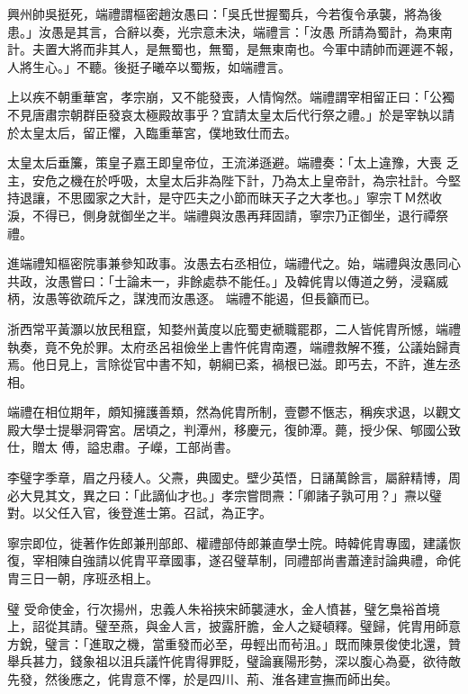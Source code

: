 \begin{pinyinscope}
 興州帥吳挺死，端禮謂樞密趙汝愚曰：「吳氏世握蜀兵，今若復令承襲，將為後患。」汝愚是其言，合辭以奏，光宗意未決，端禮言：「汝愚
 所請為蜀計，為東南計。夫置大將而非其人，是無蜀也，無蜀，是無東南也。今軍中請帥而遲遲不報，人將生心。」不聽。後挺子曦卒以蜀叛，如端禮言。



 上以疾不朝重華宮，孝宗崩，又不能發喪，人情恟然。端禮謂宰相留正曰：「公獨不見唐肅宗朝群臣發哀太極殿故事乎？宜請太皇太后代行祭之禮。」於是宰執以請於太皇太后，留正懼，入臨重華宮，僕地致仕而去。



 太皇太后垂簾，策皇子嘉王即皇帝位，王流涕遜避。端禮奏：「太上違豫，大喪
 乏主，安危之機在於呼吸，太皇太后非為陛下計，乃為太上皇帝計，為宗社計。今堅持退讓，不思國家之大計，是守匹夫之小節而昧天子之大孝也。」寧宗ＴＭ然收淚，不得已，側身就御坐之半。端禮與汝愚再拜固請，寧宗乃正御坐，退行禫祭禮。



 進端禮知樞密院事兼參知政事。汝愚去右丞相位，端禮代之。始，端禮與汝愚同心共政，汝愚嘗曰：「士論未一，非餘處恭不能任。」及韓侂胄以傳道之勞，浸竊威柄，汝愚等欲疏斥之，謀洩而汝愚逐。
 端禮不能遏，但長籲而已。



 浙西常平黃灝以放民租竄，知婺州黃度以庇蜀吏褫職罷郡，二人皆侂胄所憾，端禮執奏，竟不免於罪。太府丞呂祖儉坐上書忤侂胄南遷，端禮救解不獲，公議始歸責焉。他日見上，言除從官中書不知，朝綱已紊，禍根已滋。即丐去，不許，進左丞相。



 端禮在相位期年，頗知擁護善類，然為侂胄所制，壹鬱不愜志，稱疾求退，以觀文殿大學士提舉洞霄宮。居頃之，判潭州，移慶元，復帥潭。薨，授少保、郇國公致仕，贈太
 傅，謚忠肅。子嶸，工部尚書。



 李璧字季章，眉之丹稜人。父燾，典國史。壁少英悟，日誦萬餘言，屬辭精博，周必大見其文，異之曰：「此謫仙才也。」孝宗嘗問燾：「卿諸子孰可用？」燾以璧對。以父任入官，後登進士第。召試，為正字。



 寧宗即位，徙著作佐郎兼刑部郎、權禮部侍郎兼直學士院。時韓侂胄專國，建議恢復，宰相陳自強請以侂胄平章國事，遂召璧草制，同禮部尚書蕭達討論典禮，命侂胄三日一朝，序班丞相上。



 璧
 受命使金，行次揚州，忠義人朱裕挾宋師襲漣水，金人憤甚，璧乞梟裕首境上，詔從其請。璧至燕，與金人言，披露肝膽，金人之疑頓釋。璧歸，侂胄用師意方銳，璧言：「進取之機，當重發而必至，毋輕出而茍沮。」既而陳景俊使北還，贊舉兵甚力，錢象祖以沮兵議忤侂胄得罪貶，璧論襄陽形勢，深以腹心為憂，欲待敵先發，然後應之，侂胄意不懌，於是四川、荊、淮各建宣撫而師出矣。




\end{pinyinscope}
